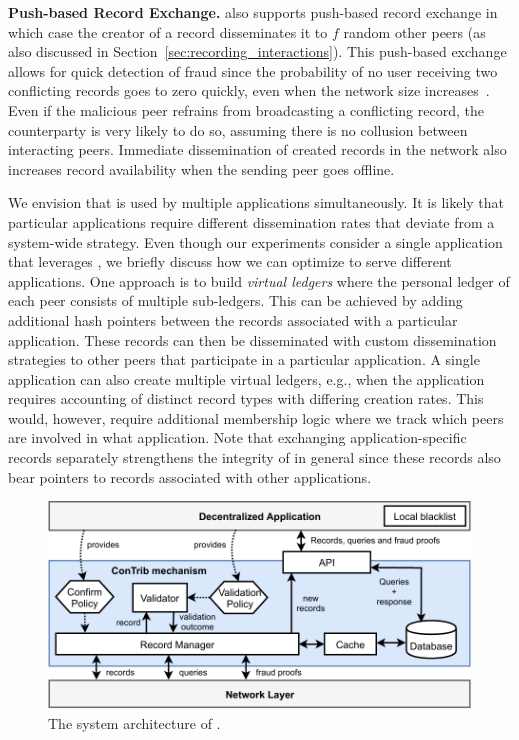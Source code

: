 \textbf{Push-based Record Exchange.}
\TrustChain{} also supports push-based record exchange in which case the creator of a record disseminates it to $ f $ random other peers (as also discussed in Section~\ref{sec:recording_interactions}).
This push-based exchange allows for quick detection of fraud since the probability of no user receiving two conflicting records goes to zero quickly, even when the network size increases~\cite{osipkov2007combating}.
Even if the malicious peer refrains from broadcasting a conflicting record, the counterparty is very likely to do so, assuming there is no collusion between interacting peers.
Immediate dissemination of created records in the network also increases record availability when the sending peer goes offline.

We envision that \TrustChain{} is used by multiple applications simultaneously.
It is likely that particular applications require different dissemination rates that deviate from a system-wide strategy.
Even though our experiments consider a single application that leverages \TrustChain{}, we briefly discuss how we can optimize \TrustChain{} to serve different applications.
One approach is to build \emph{virtual ledgers} where the personal ledger of each peer consists of multiple sub-ledgers.
This can be achieved by adding additional hash pointers between the records associated with a particular application.
These records can then be disseminated with custom dissemination strategies to other peers that participate in a particular application.
A single application can also create multiple virtual ledgers, e.g., when the application requires accounting of distinct record types with differing creation rates.
This would, however, require additional membership logic where we track which peers are involved in what application.
Note that exchanging application-specific records separately strengthens the integrity of \TrustChain{} in general since these records also bear pointers to records associated with other applications.

\begin{figure}[t]
	\centering
	\includegraphics[width=\linewidth]{trustchain/assets/system_architecture}
	\caption{The system architecture of \TrustChain{}.}
	\label{fig:system_architecture}
\end{figure}

